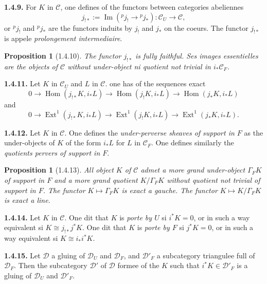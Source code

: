 \documentclass[12pt,a4paper]{article}
\theoremstyle{plain}
\newtheorem{proposition}[theorem]{Proposition}
\theoremstyle{definition}
\theoremstyle{remark}
\DeclareMathOperator{\Hom}{Hom}
\DeclareMathOperator{\Ext}{Ext}
\DeclareMathOperator{\pIm}{Im}
\newcommand{\cC}{\mathcal{C}}
\newcommand{\cD}{\mathcal{D}}
\begin{document}
\noindent
\textbf{1.4.9.} For $K$ in $\cC$, one defines of the functors between categories abeliennes
\[
j_{!*} := \pIm({}^{p}j_{!} \to {}^{p}j_{*}) : \cC_{U} \to \cC,
\]
or ${}^{p}j_{!}$ and ${}^{p}j_{*}$ are the functors induits by $j_{!}$ and $j_{*}$ on the coeurs. The functor $j_{!*}$ is appele \emph{prolongement intermediaire}.

\smallskip

\begin{proposition}[1.4.10]
The functor $j_{!*}$ is fully faithful. Ses images essentielles are the objects of $\cC$ without under-object ni quotient not trivial in $i_{*}\cC_{F}$.
\end{proposition}

\smallskip

\noindent
\textbf{1.4.11.} Let $K$ in $\cC_{U}$ and $L$ in $\cC$. one has of the sequences exact
\[
0 \to \Hom(j_{!*}K, i_{*}L) \to \Hom(j_{!}K, i_{*}L) \to \Hom(j_{*}K, i_{*}L)
\]
and
\[
0 \to \Ext^{1}(j_{!*}K, i_{*}L) \to \Ext^{1}(j_{!}K, i_{*}L) \to \Ext^{1}(j_{*}K, i_{*}L).
\]

\smallskip

\noindent
\textbf{1.4.12.} Let $K$ in $\cC$. One defines the \emph{under-perverse sheaves of support in $F$} as the under-objects of $K$ of the form $i_{*}L$ for $L$ in $\cC_{F}$. One defines similarly the \emph{quotients pervers of support in $F$}.

\smallskip

\begin{proposition}[1.4.13]
All object $K$ of $\cC$ admet a more grand under-object $\Gamma_{F}K$ of support in $F$ and a more grand quotient $K/\Gamma_{F}K$ without quotient not trivial of support in $F$. The functor $K \mapsto \Gamma_{F}K$ is exact a gauche. The functor $K \mapsto K/\Gamma_{F}K$ is exact a line.
\end{proposition}

\smallskip

\noindent
\textbf{1.4.14.} Let $K$ in $\cC$. One dit that $K$ is \emph{porte by $U$} si $i^{*}K = 0$, or in such a way equivalent si $K \cong j_{!*}j^{*}K$. One dit that $K$ is \emph{porte by $F$} si $j^{*}K = 0$, or in such a way equivalent si $K \cong i_{*}i^{*}K$.

\smallskip

\noindent
\textbf{1.4.15.} Let $\cD$ a gluing of $\cD_{U}$ and $\cD_{F}$, and $\cD'_{F}$ a subcategory triangulee full of $\cD_{F}$. Then the subcategory $\cD'$ of $\cD$ formee of the $K$ such that $i^{*}K \in \cD'_{F}$ is a gluing of $\cD_{U}$ and $\cD'_{F}$.
\end{document}
